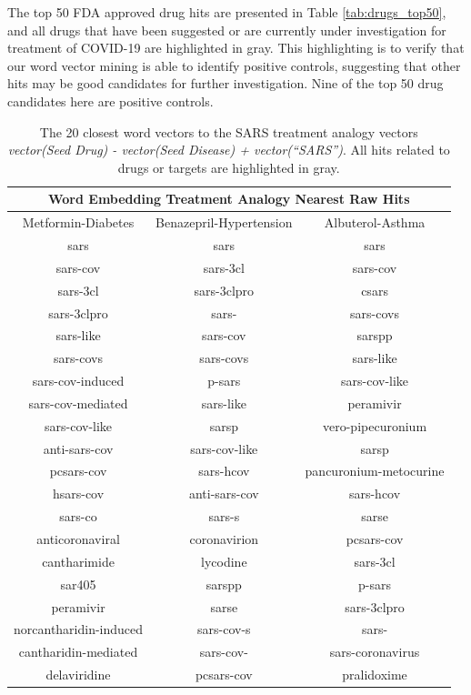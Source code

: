\documentclass{article}
\newcommand{\lgc}[1]{\cellcolor[gray]{0.85}#1}
\begin{document}
The top 50 FDA approved drug hits are presented in Table \ref{tab:drugs_top50}, and all drugs that have been suggested or are currently under investigation for treatment of COVID-19 are highlighted in gray.
This highlighting is to verify that our word vector mining is able to identify positive controls, suggesting that other hits may be good candidates for further investigation.
Nine of the top 50 drug candidates here are positive controls.


\begin{table}[t!]
\footnotesize
\centering
\caption{The 20 closest word vectors to the SARS treatment analogy vectors  \emph{vector(Seed Drug) - vector(Seed Disease) + vector(``SARS'')}. All hits related to drugs or targets are highlighted in gray.}
\label{tab:analogy_top20}
\begin{tabular}{c c c}
\hline
\multicolumn{3}{c}{Word Embedding Treatment Analogy Nearest Raw Hits} \\
\hline
Metformin-Diabetes & Benazepril-Hypertension & Albuterol-Asthma \\
\hline
sars & sars & sars \\
sars-cov & \lgc{sars-3cl} & sars-cov \\
\lgc{sars-3cl} & \lgc{sars-3clpro} & csars \\
\lgc{sars-3clpro} & sars- & sars-covs \\
sars-like & sars-cov & sarspp \\
sars-covs & sars-covs & sars-like \\
sars-cov-induced & p-sars & sars-cov-like \\
sars-cov-mediated & sars-like & \lgc{peramivir} \\
sars-cov-like & sarsp & \lgc{vero-pipecuronium} \\
anti-sars-cov & sars-cov-like & sarsp \\
pcsars-cov & sars-hcov & \lgc{pancuronium-metocurine} \\
hsars-cov & anti-sars-cov & sars-hcov \\
sars-co & sars-s & sarse \\
anticoronaviral & coronavirion & pcsars-cov \\
\lgc{cantharimide} & lycodine & \lgc{sars-3cl} \\
sar405 & sarspp & p-sars \\
\lgc{peramivir} & sarse & \lgc{sars-3clpro} \\
norcantharidin-induced & sars-cov-s & sars- \\
cantharidin-mediated & sars-cov- & sars-coronavirus \\
\lgc{delaviridine} & pcsars-cov & \lgc{pralidoxime} \\
\hline
\end{tabular}
\end{table}
\end{document}
